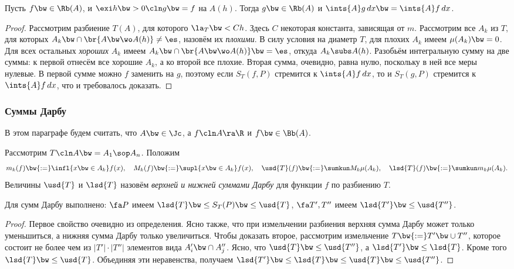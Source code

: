 \documentclass[a4paper]{article}
\begin{document}
\begin{theorem}\label{ah.bounded.function}
Пусть $f \bw\in \Rb(A)$, и $\exi h \bw> 0\cln g\bw=f$ на $A(h)$. Тогда $g \bw\in\Rb(A)$ и
$\ints{A}g\,dx \bw= \ints{A} f\,d x$.
\end{theorem}
\begin{proof}
Рассмотрим разбиение $T(A)$, для которого $\la_T \bw< Ch$. Здесь $C$ некоторая константа, зависящая от $m$.
Рассмотрим все $A_k$ из $T$, для которых $A_k \bw\cap \br{A \bw\wo A(h)} \neq \es$, назовём их
\emph{плохими}. В силу условия на диаметр $T$, для плохих $A_k$ имеем $\mu(A_k) \bw= 0$. Для всех остальных
\emph{хороших} $A_k$ имеем $A_k \bw\cap\br{A \bw\wo A(h)} \bw= \es$, откуда $A_k \subs A(h)$. Разобьём
интегральную сумму на две суммы: к первой отнесём все хорошие $A_k$, а ко второй все плохие. Вторая сумма,
очевидно, равна нулю, поскольку в ней все меры нулевые. В первой сумме можно $f$ заменить на $g$, поэтому
если $S_T(f, P)$ стремится к $\ints{A}f \,dx$, то и $S_T(g,P)$ стремится к $\ints{A}f \,dx$, что и
требовалось доказать.
\end{proof}

\subsubsection{Суммы Дарбу}

В этом параграфе будем считать, что $A \bw\in \Jc$, а $f\cln A \ra \R$ и $f\bw\in \Bb(A)$.

\begin{df}
Рассмотрим $T\cln A \bw= A_1\sop A_n$. Положим
$$m_k(f) \bw{:=}\infl{x\bw\in A_k} f(x),\quad M_k(f) \bw{:=} \supl{x\bw\in A_k} f(x), \quad
\usd{T}(f) \bw{:=}\sumkun M_k\mu(A_k), \quad \lsd{T}(f) \bw{:=} \sumkun m_k \mu(A_k).$$
Величины $\usd{T}$ и $\lsd{T}$ назовём \emph{верхней и нижней суммами Дарбу} для функции $f$ по разбиению $T$.
\end{df}

\begin{lemma}
Для сумм Дарбу выполнено: $\fa P$ имеем $\lsd{T} \bw\le S_T(P) \bw\le \usd{T}$,
$\fa T', T''$ имеем $\lsd{T'} \bw\le \usd{T''}$.
\end{lemma}
\begin{proof}
Первое свойство очевидно из определения. Ясно также, что при измельчении разбиения верхняя сумма
Дарбу может только уменьшиться, а нижняя сумма Дарбу только увеличиться. Чтобы доказать второе,
рассмотрим измельчение $T \bw{:=} T' \bw\cup T''$, которое состоит не более чем из $|T'| \cdot |T''|$
элементов вида $A'_i \bw\cap A''_j$. Ясно, что $\usd{T} \bw\le \usd{T''}$, а $\lsd{T'}\bw\le \lsd{T}$. Кроме
того $\lsd{T} \bw\le \usd{T}$. Объединяя эти неравенства, получаем $\lsd{T'} \bw\le \lsd{T}\bw\le \usd{T}
\bw\le \usd{T''}$.
\end{proof}
\end{document}
